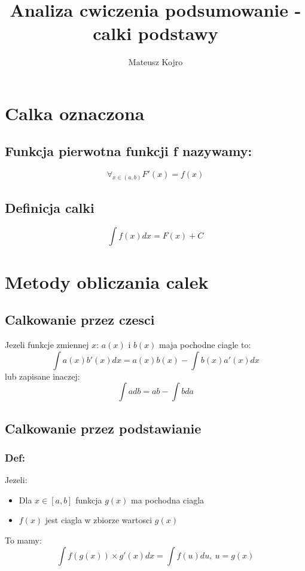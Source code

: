 \documentclass[]{article}
\title{Analiza cwiczenia podsumowanie - calki podstawy}
\author{Mateusz Kojro}
\begin{document}
\maketitle
\section{Calka oznaczona}
\subsection{Funkcja pierwotna funkcji f nazywamy:}
\begin{equation}
  \forall_{x \in (a,b)} F'(x) = f(x)
\end{equation}
\subsection{Definicja calki}
\begin{equation}
  \int f(x)dx = F(x) + C
\end{equation}
\section{Metody obliczania calek}
\subsection{Calkowanie przez czesci}
Jezeli funkcje zmiennej $x$: $a(x)$ i $b(x)$ maja pochodne ciagle to:
\begin{equation}
  \int{a(x) b'(x) dx} = a(x)b(x) - \int{b(x)a'(x)dx}
\end{equation}
lub zapisane inaczej:
\begin{equation}
  \int{adb} = ab - \int{bda}
\end{equation}
\subsection{Calkowanie przez podstawianie}
\label{subsec:podstawianie}
\subsubsection{Def:}
Jezeli:
\begin{itemize}
\item Dla $x \in [a,b]$ funkcja $g(x)$ ma pochodna ciagla
\item $f(x)$ jest ciagla w zbiorze wartosci $g(x)$
\end{itemize}
To mamy:
\begin{equation}
  \int{f(g(x)) \times g'(x)dx} = \int{f(u)du}, \ u = g(x)
\end{equation}
\end{document}
